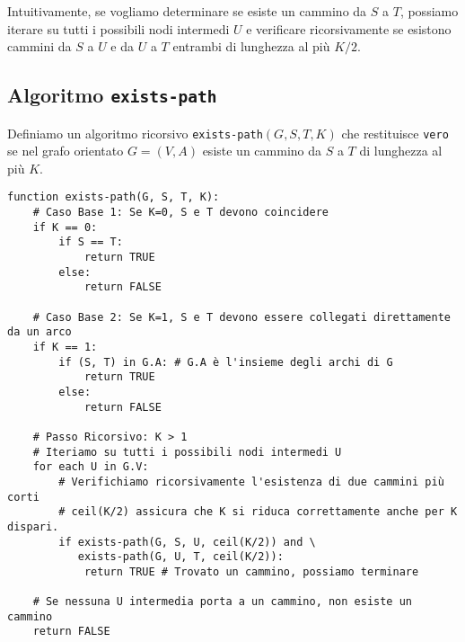 \documentclass[a4paper]{article}
\theoremstyle{definition} %
\begin{document}
Intuitivamente, se vogliamo determinare se esiste un cammino da $S$ a $T$, possiamo iterare su tutti i possibili nodi intermedi $U$ e verificare ricorsivamente se esistono cammini da $S$ a $U$ e da $U$ a $T$ entrambi di lunghezza al più $K/2$.

\subsection{Algoritmo \texttt{exists-path}}
Definiamo un algoritmo ricorsivo \texttt{exists-path}$(G, S, T, K)$ che restituisce \texttt{vero} se nel grafo orientato $G=(V,A)$ esiste un cammino da $S$ a $T$ di lunghezza al più $K$.

\begin{verbatim}
function exists-path(G, S, T, K):
    # Caso Base 1: Se K=0, S e T devono coincidere
    if K == 0:
        if S == T:
            return TRUE
        else:
            return FALSE

    # Caso Base 2: Se K=1, S e T devono essere collegati direttamente da un arco
    if K == 1:
        if (S, T) in G.A: # G.A è l'insieme degli archi di G
            return TRUE
        else:
            return FALSE
    
    # Passo Ricorsivo: K > 1
    # Iteriamo su tutti i possibili nodi intermedi U
    for each U in G.V:
        # Verifichiamo ricorsivamente l'esistenza di due cammini più corti
        # ceil(K/2) assicura che K si riduca correttamente anche per K dispari.
        if exists-path(G, S, U, ceil(K/2)) and \
           exists-path(G, U, T, ceil(K/2)):
            return TRUE # Trovato un cammino, possiamo terminare
            
    # Se nessuna U intermedia porta a un cammino, non esiste un cammino
    return FALSE
\end{verbatim}
\end{document}
